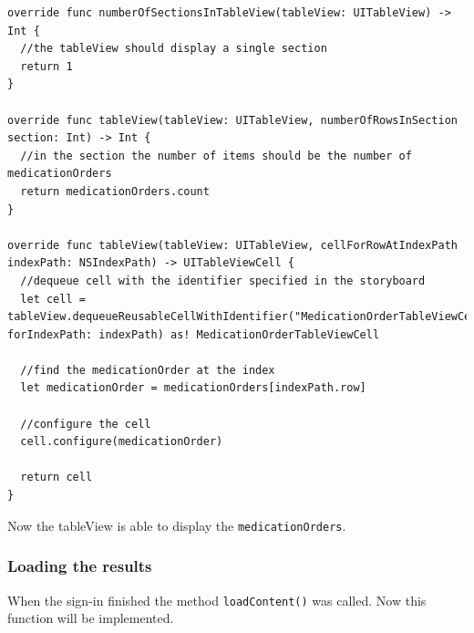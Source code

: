 \documentclass{article}
\begin{document}
\begin{verbatim}
override func numberOfSectionsInTableView(tableView: UITableView) -> Int {
  //the tableView should display a single section
  return 1
}

override func tableView(tableView: UITableView, numberOfRowsInSection section: Int) -> Int {
  //in the section the number of items should be the number of medicationOrders
  return medicationOrders.count
}

override func tableView(tableView: UITableView, cellForRowAtIndexPath indexPath: NSIndexPath) -> UITableViewCell {
  //dequeue cell with the identifier specified in the storyboard
  let cell = tableView.dequeueReusableCellWithIdentifier("MedicationOrderTableViewCell", forIndexPath: indexPath) as! MedicationOrderTableViewCell

  //find the medicationOrder at the index
  let medicationOrder = medicationOrders[indexPath.row]

  //configure the cell
  cell.configure(medicationOrder)

  return cell
}
\end{verbatim}

Now the tableView is able to display the \texttt{medicationOrders}.

\subsubsection{Loading the results}\label{loading-the-results}

When the sign-in finished the method \texttt{loadContent()} was called.
Now this function will be implemented.
\end{document}
